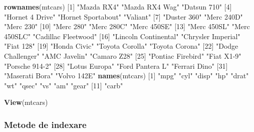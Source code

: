 \documentclass[]{article}
\newenvironment{Shaded}{\begin{snugshade}}{\end{snugshade}}
\newcommand{\DecValTok}[1]{\textcolor[rgb]{0.00,0.00,0.81}{#1}}
\newcommand{\KeywordTok}[1]{\textcolor[rgb]{0.13,0.29,0.53}{\textbf{#1}}}
\newcommand{\NormalTok}[1]{#1}
\newcommand{\StringTok}[1]{\textcolor[rgb]{0.31,0.60,0.02}{#1}}
\begin{document}
\begin{Shaded}
\begin{Highlighting}[]
\KeywordTok{rownames}\NormalTok{(mtcars)}
\NormalTok{ [}\DecValTok{1}\NormalTok{] }\StringTok{"Mazda RX4"}           \StringTok{"Mazda RX4 Wag"}       \StringTok{"Datsun 710"}         
\NormalTok{ [}\DecValTok{4}\NormalTok{] }\StringTok{"Hornet 4 Drive"}      \StringTok{"Hornet Sportabout"}   \StringTok{"Valiant"}            
\NormalTok{ [}\DecValTok{7}\NormalTok{] }\StringTok{"Duster 360"}          \StringTok{"Merc 240D"}           \StringTok{"Merc 230"}           
\NormalTok{[}\DecValTok{10}\NormalTok{] }\StringTok{"Merc 280"}            \StringTok{"Merc 280C"}           \StringTok{"Merc 450SE"}         
\NormalTok{[}\DecValTok{13}\NormalTok{] }\StringTok{"Merc 450SL"}          \StringTok{"Merc 450SLC"}         \StringTok{"Cadillac Fleetwood"} 
\NormalTok{[}\DecValTok{16}\NormalTok{] }\StringTok{"Lincoln Continental"} \StringTok{"Chrysler Imperial"}   \StringTok{"Fiat 128"}           
\NormalTok{[}\DecValTok{19}\NormalTok{] }\StringTok{"Honda Civic"}         \StringTok{"Toyota Corolla"}      \StringTok{"Toyota Corona"}      
\NormalTok{[}\DecValTok{22}\NormalTok{] }\StringTok{"Dodge Challenger"}    \StringTok{"AMC Javelin"}         \StringTok{"Camaro Z28"}         
\NormalTok{[}\DecValTok{25}\NormalTok{] }\StringTok{"Pontiac Firebird"}    \StringTok{"Fiat X1-9"}           \StringTok{"Porsche 914-2"}      
\NormalTok{[}\DecValTok{28}\NormalTok{] }\StringTok{"Lotus Europa"}        \StringTok{"Ford Pantera L"}      \StringTok{"Ferrari Dino"}       
\NormalTok{[}\DecValTok{31}\NormalTok{] }\StringTok{"Maserati Bora"}       \StringTok{"Volvo 142E"}         
\KeywordTok{names}\NormalTok{(mtcars)}
\NormalTok{ [}\DecValTok{1}\NormalTok{] }\StringTok{"mpg"}  \StringTok{"cyl"}  \StringTok{"disp"} \StringTok{"hp"}   \StringTok{"drat"} \StringTok{"wt"}   \StringTok{"qsec"} \StringTok{"vs"}   \StringTok{"am"}   \StringTok{"gear"}
\NormalTok{[}\DecValTok{11}\NormalTok{] }\StringTok{"carb"}
\end{Highlighting}
\end{Shaded}

\begin{Shaded}
\begin{Highlighting}[]
\KeywordTok{View}\NormalTok{(mtcars) }
\end{Highlighting}
\end{Shaded}

\hypertarget{metode-de-indexare}{%
\subsubsection{Metode de indexare}\label{metode-de-indexare}}
\end{document}
